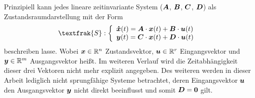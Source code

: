 Prinzipiell kann jedes lineare zeitinvariante System 
($\boldsymbol{A}$, $\boldsymbol{B}$, $\boldsymbol{C}$, $\boldsymbol{D}$) als Zustandsraumdarstellung mit der Form
\begin{equation}
\textfrak{S} 
: \left\{ \begin{array}{ll}
\bs{\dot{x}}(t) = \bs{A}\cdot \bs{x}(t) + \bs{B}\cdot \bs{u}(t) \\
\bs{y}(t) = \bs{C}\cdot \bs{x}(t) + \bs{D}\cdot \bs{u}(t)
\end{array}
\right.
\end{equation}
beschreiben lasse. Wobei $\boldsymbol{x} \in \mathbb{R}^n$ Zustandsvektor, $\boldsymbol{u} \in \mathbb{R}^r$ Eingangsvektor und $\boldsymbol{y} \in \mathbb{R}^m$ Ausgangsvektor heißt. Im weiteren Verlauf wird die Zeitabhängigkeit dieser drei Vektoren nicht mehr explizit angegeben. Des weiteren werden in dieser Arbeit lediglich nicht sprungfähige Systeme  betrachtet, deren Eingangsvektor $\boldsymbol{u}$  den Ausgangsvektor $\boldsymbol{y}$ nicht direkt beeinflusst und somit $\boldsymbol{D} = \boldsymbol{0}$ gilt.


